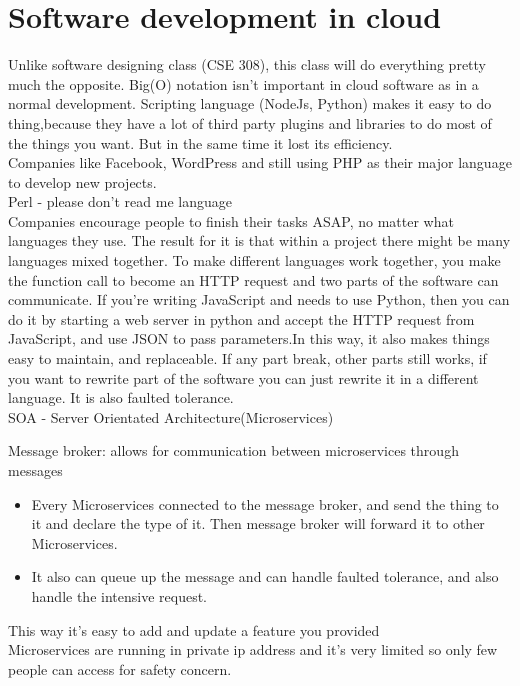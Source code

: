 \documentclass[fancy,11pt,titlestyle=display]{style/elegantbook}
\begin{document}
\section{Software development in cloud}
Unlike software designing class (CSE 308), this class will do everything pretty much the opposite. Big(O) notation isn't important in cloud software as in a normal development. Scripting language (NodeJs, Python) makes it easy to do thing,because they have a lot of third party plugins and libraries to do most of the things you want. But in the same time it lost its efficiency.
\\
Companies like Facebook, WordPress and still using PHP as their major language to develop new projects.
\\Perl - please don't read me language
\\ Companies encourage people to finish their tasks ASAP, no matter what languages they use. The result for it is that within a project there might be many languages mixed together. To make different languages work together, you make the function call to become an HTTP request and two parts of the software can communicate. If you're writing JavaScript and needs to use Python, then you can do it by starting a web server in python and accept the HTTP request from JavaScript, and use JSON to pass parameters.In this way, it also makes things easy to maintain, and replaceable. If any part break, other parts still works, if you want to rewrite part of the software you can just rewrite it in a different language. It is also faulted tolerance.\\
SOA - Server Orientated Architecture(Microservices)

\par Message broker: allows for communication between microservices through messages
\begin{itemize}
    \item Every Microservices connected to the message broker, and send the thing to it and declare the type of it. Then message broker will forward it to other Microservices.
    \item It also can queue up the message and can handle faulted tolerance, and also handle the intensive request.
\end{itemize}

This way it's easy to add and update a feature you provided\\
Microservices are running in private ip address and it's very limited so only few people can access for safety concern.
\end{document}
